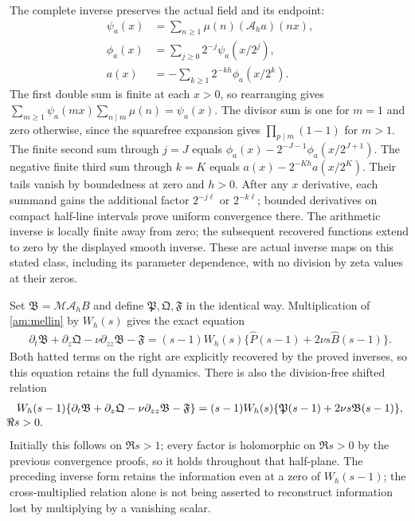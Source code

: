 The complete inverse preserves the actual field and its endpoint:
\begin{align*}
 \psi_a(x)&=\sum_{n\geq1}\mu(n)(\mathcal A_ha)(nx),\\
 \phi_a(x)&=\sum_{j\geq0}2^{-j}\psi_a(x/2^j),\\
 a(x)&=-\sum_{k\geq1}2^{-kh}\phi_a(x/2^k).
\end{align*}
The first double sum is finite at each $x>0$, so rearranging gives
$\sum_{m\geq1}\psi_a(mx)\sum_{n\mid m}\mu(n)=\psi_a(x)$.
The divisor sum is one for $m=1$ and zero otherwise, since the
squarefree expansion gives $\prod_{p\mid m}(1-1)$ for $m>1$.
The finite second sum through $j=J$ equals
$\phi_a(x)-2^{-J-1}\phi_a(x/2^{J+1})$.
The negative finite third sum through $k=K$ equals
$a(x)-2^{-Kh}a(x/2^K)$. Their tails vanish by boundedness at zero
and $h>0$. After any $x$ derivative, each summand gains the additional
factor $2^{-j\ell}$ or $2^{-k\ell}$; bounded derivatives on compact
half-line intervals prove uniform convergence there. The arithmetic
inverse is locally finite away from zero; the subsequent recovered
functions extend to zero by the displayed smooth inverse. These are
actual inverse maps on this stated class, including its parameter
dependence, with no division by zeta values at their zeros.

Set $\mathfrak B=\mathcal M\mathcal A_hB$ and define
$\mathfrak P,\mathfrak Q,\mathfrak F$ in the identical way.
Multiplication of \eqref{am:mellin} by $W_h(s)$ gives the exact
equation
\begin{align*}
 \partial_t\mathfrak B+\partial_z\mathfrak Q
       -\nu\partial_{zz}\mathfrak B-\mathfrak F
  =(s-1)W_h(s)\{\widehat P(s-1)+2\nu s\widehat B(s-1)\}.
\end{align*}
Both hatted terms on the right are explicitly recovered by the
proved inverses, so this equation retains the full dynamics. There is
also the division-free shifted relation
\begin{equation}
 \begin{split}
 W_h(s-1)\{\partial_t\mathfrak B+\partial_z\mathfrak Q
       -\nu\partial_{zz}\mathfrak B-\mathfrak F\}
  &=(s-1)W_h(s)\{\mathfrak P(s-1)
                        +2\nu s\mathfrak B(s-1)\},\\[-2pt]
 &\hspace{-60mm}\Re s>0.
 \end{split}
 \label{am:arithmeticpde}
\end{equation}
Initially this follows on $\Re s>1$; every factor is holomorphic on
$\Re s>0$ by the previous convergence proofs, so it holds throughout
that half-plane. The preceding inverse form retains the information
even at a zero of $W_h(s-1)$; the cross-multiplied relation alone is
not being asserted to reconstruct information lost by multiplying
by a vanishing scalar.

